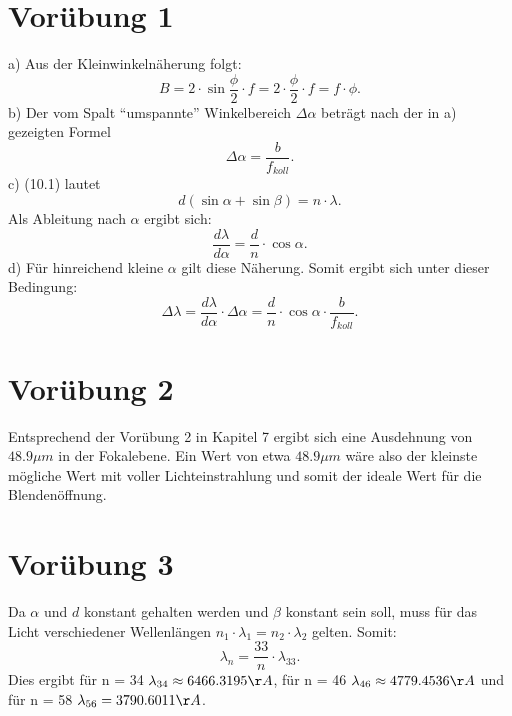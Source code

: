 \documentclass[titlepage]{scrartcl}
\begin{document}
\section{Vorübung 1}
a) Aus der Kleinwinkelnäherung folgt: 
\begin{equation}
B = 2\cdot \sin{\frac{\phi}{2}} \cdot f = 2 \cdot \frac{\phi}{2} \cdot f = f \cdot \phi.
\end{equation}
b) Der vom Spalt \enquote{umspannte} Winkelbereich $\Delta \alpha $ beträgt nach der in a) gezeigten Formel 
\begin{equation}
\Delta \alpha = \frac{b}{f_{koll}}.
\end{equation}
c) (10.1) lautet 
\begin{equation}
d(\sin \alpha  + \sin \beta) = n \cdot \lambda. 
\end{equation}
Als Ableitung nach $\alpha$ ergibt sich:
\begin{equation}
\frac{d\lambda}{d\alpha} = \frac{d}{n} \cdot \cos{\alpha}.
\end{equation}
d) Für hinreichend kleine $\alpha$ gilt diese Näherung. Somit ergibt sich unter dieser Bedingung:
\begin{equation}
\Delta \lambda = \frac{d\lambda}{d\alpha} \cdot \Delta \alpha = \frac{d}{n} \cdot \cos{\alpha} \cdot \frac{b}{f_{koll}}.
\end{equation} 
\section{Vorübung 2}
Entsprechend der Vorübung 2 in Kapitel 7 ergibt sich eine Ausdehnung von $48.9 \mu m$ in der Fokalebene. Ein Wert von etwa $48.9 \mu m$ wäre also der kleinste mögliche Wert mit voller Lichteinstrahlung und somit der ideale Wert für die Blendenöffnung. 
\section{Vorübung 3}
Da $\alpha$ und $d$ konstant gehalten werden und $\beta$ konstant sein soll, muss für das Licht verschiedener Wellenlängen $n_1 \cdot \lambda_1 = n_2 \cdot \lambda_2$ gelten. 
Somit: 
\begin{equation}
\lambda_n = \frac{33}{n} \cdot \lambda_{33}.
\end{equation}
Dies ergibt für n = 34 $\lambda_{34} \approx 6466.3195 \AA$, für n = 46 $\lambda_{46} \approx 4779.4536 \AA$ und für n = 58 $\lambda_{56} = 3790.6011 \AA$.
\end{document}
